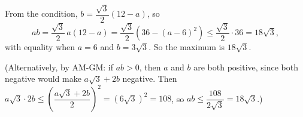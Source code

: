From the condition, $b=\dfrac{\sqrt3}{2}(12-a)$, so
\[
ab=\dfrac{\sqrt3}{2}\,a(12-a)=\dfrac{\sqrt3}{2}\left(36-(a-6)^2\right)\le\dfrac{\sqrt3}{2}\cdot36=18\sqrt3,
\]
with equality when $a=6$ and $b=3\sqrt3$. So the maximum is $\boxed{18\sqrt3}$.

(Alternatively, by AM-GM: if $ab>0$, then $a$ and $b$ are both positive, since both negative would make $a\sqrt3+2b$ negative. Then $a\sqrt3\cdot2b\le\left(\dfrac{a\sqrt3+2b}{2}\right)^2=\left(6\sqrt3\right)^2=108$, so $ab\le\dfrac{108}{2\sqrt3}=18\sqrt3$.)
